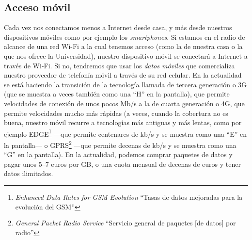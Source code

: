 \subsection{Acceso móvil} Cada vez nos conectamos menos a Internet desde casa, y más desde nuestros dispositivos móviles como por ejemplo los \emph{smartphones}. Si estamos en el radio de alcance de una red Wi-Fi a la cual tenemos acceso (como la de nuestra casa o la que nos ofrece la Universidad), nuestro dispositivo móvil se conectará a Internet a través de Wi-Fi. Si no, tendremos que usar los \emph{datos móviles} que comercializa nuestro proveedor de telefonía móvil a través de su red celular. En la actualidad se está haciendo la transición de la tecnología llamada de tercera generación o 3G (que se muestra a veces también como una ``H'' en la pantalla), que permite velocidades de conexión de unos pocos Mb/s a la de cuarta generación o 4G, que permite velocidades mucho más rápidas (a veces, cuando la cobertura no es buena, nuestro móvil recurre a tecnologías más antiguas y más lentas, como por ejemplo EDGE\footnote{\emph{Enhanced Data Rates for GSM Evolution} ``Tasas de datos mejoradas para la evolución del GSM''} ---que permite centenares de kb/s y se muestra como una ``E'' en la pantalla--- o GPRS\footnote{\emph{General Packet Radio Service} ``Servicio general de paquetes [de datos] por radio''} ---que permite decenas de kb/s y se muestra como una ``G'' en la pantalla). En la actualidad, podemos comprar paquetes de datos y pagar unos 5--7 euros por GB, o una cuota mensual de decenas de euros y tener datos ilimitados. 

